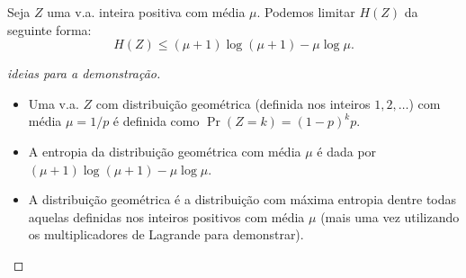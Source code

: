 \begin{frame}[allowframebreaks]
  \begin{lemma}
  Seja $Z$ uma v.a. inteira positiva com média $\mu$. Podemos limitar $H(Z)$ da seguinte forma:
	\vspace{-1em}
	\begin{equation}
	H(Z) \leq (\mu + 1) \log (\mu + 1) - \mu \log \mu .
	\end{equation}
  \end{lemma}
  \begin{proof}[ideias para a demonstração]
  \begin{itemize}
  \item Uma v.a. $Z$ com distribuição geométrica (definida nos inteiros $1,2,\ldots$)
	com média $\mu = 1/p$ é definida como $\Pr(Z=k) = (1-p)^k p$.
  \item A entropia da distribuição geométrica com média $\mu$ é dada por
	$(\mu+1) \log(\mu +1) - \mu \log \mu$.
  \item A distribuição geométrica é a distribuição com máxima entropia dentre todas aquelas
	definidas nos inteiros positivos com média $\mu$ (mais uma vez utilizando 
	os multiplicadores de Lagrande para demonstrar).
  \end{itemize}
  \end{proof}
\end{frame}


